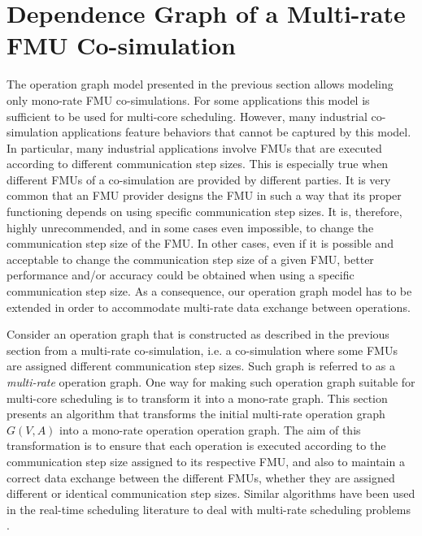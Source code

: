 \section{\label{sec:opgraph}Dependence Graph of a Multi-rate FMU Co-simulation}

The operation graph model presented in the previous section allows modeling only mono-rate FMU co-simulations. For some applications this model is sufficient to be used for multi-core scheduling. However, many industrial co-simulation applications feature behaviors that cannot be captured by this model. In particular, many industrial applications involve FMUs that are executed according to different communication step sizes. This is especially true when different FMUs of a co-simulation are provided by different parties. It is very common that an FMU provider designs the FMU in such a way that its proper functioning depends on using specific communication step sizes. It is, therefore, highly unrecommended, and in some cases even impossible, to change the communication step size of the FMU. In other cases, even if it is possible and acceptable to change the communication step size of a given FMU, better performance and/or accuracy could be obtained when using a specific communication step size. As a consequence, our operation graph model has to be extended in order to accommodate multi-rate data exchange between operations. 

Consider an operation graph that is constructed as described in the previous section from a multi-rate co-simulation, i.e. a co-simulation where some FMUs are assigned different communication step sizes. Such graph is referred to as a \textit{multi-rate} operation graph. One way for making such operation graph suitable for multi-core scheduling is to transform it into a mono-rate graph. This section presents an algorithm that transforms the initial multi-rate operation graph $G(V,A)$ into a mono-rate operation operation graph. %
The aim of this transformation is to ensure that each operation is executed according to the communication step size assigned to its respective FMU, and also to maintain a correct data exchange between the different FMUs, whether they are assigned different or identical communication step sizes. Similar algorithms have been used in the real-time scheduling literature to deal with multi-rate scheduling problems \cite{kermia:2009, ramamritham:1995}.

